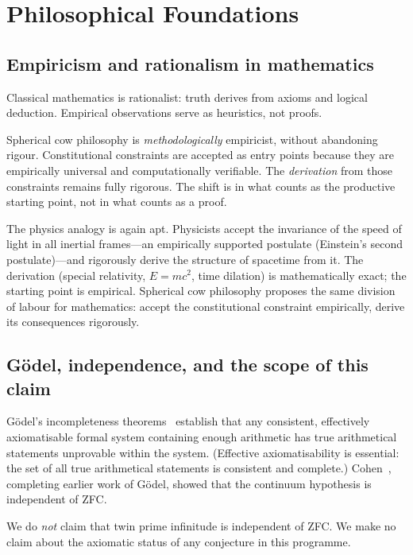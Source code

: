 \documentclass[12pt]{amsart}
\theoremstyle{plain}
\theoremstyle{definition}
\theoremstyle{remark}
\begin{document}
\section{Philosophical Foundations}

\subsection{Empiricism and rationalism in mathematics}

Classical mathematics is rationalist: truth derives from axioms and logical
deduction. Empirical observations serve as heuristics, not proofs.

Spherical cow philosophy is \emph{methodologically} empiricist, without
abandoning rigour. Constitutional constraints are accepted as entry points
because they are empirically universal and computationally verifiable. The
\emph{derivation} from those constraints remains fully rigorous. The shift is
in what counts as the productive starting point, not in what counts as a proof.

The physics analogy is again apt. Physicists accept the invariance of the
speed of light in all inertial frames---an empirically supported postulate
(Einstein's second postulate)---and rigorously derive the structure of
spacetime from it. The derivation (special relativity, $E = mc^2$, time
dilation) is mathematically exact; the starting point is empirical. Spherical cow philosophy
proposes the same division of labour for mathematics: accept the constitutional
constraint empirically, derive its consequences rigorously.

\subsection{G\"odel, independence, and the scope of this claim}
\label{sec:godel}

G\"odel's incompleteness theorems~\cite{Godel1931} establish that any
consistent, effectively axiomatisable formal system containing enough
arithmetic has true arithmetical statements unprovable within the system.
(Effective axiomatisability is essential: the set of all true arithmetical
statements is consistent and complete.) Cohen~\cite{Cohen1963}, completing
earlier work of G\"odel, showed that the continuum hypothesis is independent
of ZFC.

We do \emph{not} claim that twin prime infinitude is independent of ZFC.
We make no claim about the axiomatic status of any conjecture in this programme.
\end{document}
